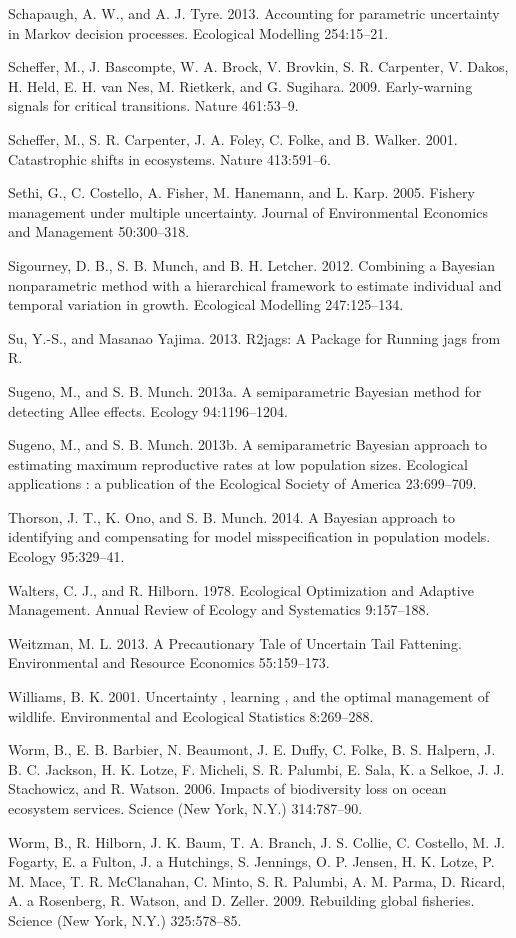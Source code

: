 \documentclass[author-year, 12pt,review]{components/elsarticle} %
\begin{document}
Schapaugh, A. W., and A. J. Tyre. 2013. Accounting for parametric
uncertainty in Markov decision processes. Ecological Modelling
254:15--21.

Scheffer, M., J. Bascompte, W. A. Brock, V. Brovkin, S. R. Carpenter, V.
Dakos, H. Held, E. H. van Nes, M. Rietkerk, and G. Sugihara. 2009.
Early-warning signals for critical transitions. Nature 461:53--9.

Scheffer, M., S. R. Carpenter, J. A. Foley, C. Folke, and B. Walker.
2001. Catastrophic shifts in ecosystems. Nature 413:591--6.

Sethi, G., C. Costello, A. Fisher, M. Hanemann, and L. Karp. 2005.
Fishery management under multiple uncertainty. Journal of Environmental
Economics and Management 50:300--318.

Sigourney, D. B., S. B. Munch, and B. H. Letcher. 2012. Combining a
Bayesian nonparametric method with a hierarchical framework to estimate
individual and temporal variation in growth. Ecological Modelling
247:125--134.

Su, Y.-S., and Masanao Yajima. 2013. R2jags: A Package for Running jags
from R.

Sugeno, M., and S. B. Munch. 2013a. A semiparametric Bayesian method for
detecting Allee effects. Ecology 94:1196--1204.

Sugeno, M., and S. B. Munch. 2013b. A semiparametric Bayesian approach
to estimating maximum reproductive rates at low population sizes.
Ecological applications : a publication of the Ecological Society of
America 23:699--709.

Thorson, J. T., K. Ono, and S. B. Munch. 2014. A Bayesian approach to
identifying and compensating for model misspecification in population
models. Ecology 95:329--41.

Walters, C. J., and R. Hilborn. 1978. Ecological Optimization and
Adaptive Management. Annual Review of Ecology and Systematics
9:157--188.

Weitzman, M. L. 2013. A Precautionary Tale of Uncertain Tail Fattening.
Environmental and Resource Economics 55:159--173.

Williams, B. K. 2001. Uncertainty , learning , and the optimal
management of wildlife. Environmental and Ecological Statistics
8:269--288.

Worm, B., E. B. Barbier, N. Beaumont, J. E. Duffy, C. Folke, B. S.
Halpern, J. B. C. Jackson, H. K. Lotze, F. Micheli, S. R. Palumbi, E.
Sala, K. a Selkoe, J. J. Stachowicz, and R. Watson. 2006. Impacts of
biodiversity loss on ocean ecosystem services. Science (New York, N.Y.)
314:787--90.

Worm, B., R. Hilborn, J. K. Baum, T. A. Branch, J. S. Collie, C.
Costello, M. J. Fogarty, E. a Fulton, J. a Hutchings, S. Jennings, O. P.
Jensen, H. K. Lotze, P. M. Mace, T. R. McClanahan, C. Minto, S. R.
Palumbi, A. M. Parma, D. Ricard, A. a Rosenberg, R. Watson, and D.
Zeller. 2009. Rebuilding global fisheries. Science (New York, N.Y.)
325:578--85.
\end{document}
